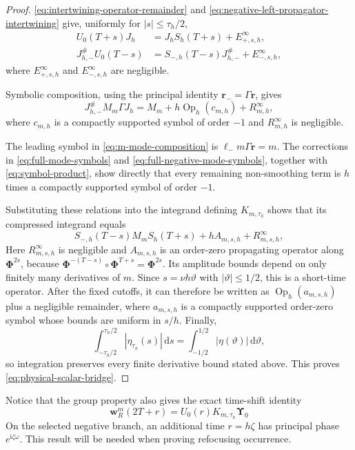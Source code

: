 \documentclass[11pt,reqno]{amsart}
\newcommand{\ii}{\mathrm{i}}
\newcommand{\dd}{\,\mathrm{d}}
\newcommand{\Op}{\operatorname{Op}}
\numberwithin{equation}{section}
\begin{document}
\begin{proof}
\eqref{eq:intertwining-operator-remainder} and \eqref{eq:negative-left-propagator-intertwining} give, uniformly for $|s|\le\tau_h/2$,
\begin{align*}
 U_0(T+s)J_h&=J_hS_h(T+s)+E_{+,s,h}^{\infty},\\
 J_{h,-}^{\#}U_0(T-s)&=S_{-,h}(T-s)J_{h,-}^{\#}+E_{-,s,h}^{\infty},
\end{align*}
where $E_{+,s,h}^{\infty}$ and $E_{-,s,h}^{\infty}$ are negligible.

Symbolic composition, using the principal identity $\bm r_-=\Gamma\bm r$, gives
\begin{equation}\label{eq:m-mode-composition}
 J_{h,-}^{\#}M_m\Gamma J_h=M_m+h\Op_h(c_{m,h})+R_{m,h}^{\infty},
\end{equation}
where $c_{m,h}$ is a compactly supported symbol of order $-1$ and $R_{m,h}^{\infty}$ is negligible.

The leading symbol in \eqref{eq:m-mode-composition} is $\bm\ell_-m\Gamma\bm r=m$. The corrections in \eqref{eq:full-mode-symbols} and \eqref{eq:full-negative-mode-symbols}, together with \eqref{eq:symbol-product}, show directly that every remaining non-smoothing term is $h$ times a compactly supported symbol of order $-1$.

Substituting these relations into the integrand defining $K_{m,\tau_h}$ shows that its compressed integrand equals
\begin{equation*}
 S_{-,h}(T-s)M_mS_h(T+s)+hA_{m,s,h}+R_{m,s,h}^{\infty},
\end{equation*}
Here $R_{m,s,h}^{\infty}$ is negligible and $A_{m,s,h}$ is an order-zero propagating operator along $\bm\Phi^{2s}$, because
$\bm\Phi^{-(T-s)}\circ\bm\Phi^{T+s}=\bm\Phi^{2s}$. Its amplitude bounds depend on only finitely many derivatives of $m$. Since $s=\nu h\vartheta$ with $|\vartheta|\le1/2$, this is a short-time operator. After the fixed cutoffs, it can therefore be written as $\Op_h(a_{m,s,h})$ plus a negligible remainder, where $a_{m,s,h}$ is a compactly supported order-zero symbol whose bounds are uniform in $s/h$. Finally,
\begin{equation*}
 \int_{-\tau_h/2}^{\tau_h/2}|\eta_{\tau_h}(s)|\dd s=\int_{-1/2}^{1/2}|\eta(\vartheta)|\dd\vartheta,
\end{equation*}
so integration preserves every finite derivative bound stated above. This proves \eqref{eq:physical-scalar-bridge}.
\end{proof}

Notice that the group property also gives the exact time-shift identity
\begin{equation*}
\bm{w}_R^m(2T+r)=U_0(r)K_{m,\tau_h}\bm{\Upsilon}_0
\end{equation*}
On the selected negative branch, an additional time $r=h\zeta$ has principal phase $e^{\ii\zeta\omega}$. This result will be needed when proving refocusing occurrence. 
\end{document}

